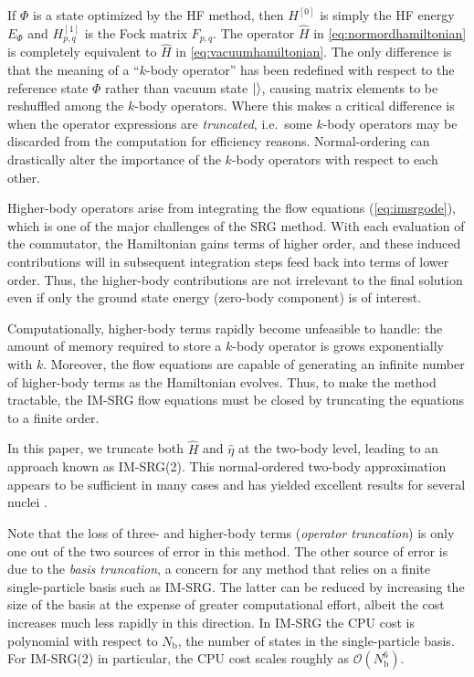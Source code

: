 If $\Phi$ is a state optimized by the HF method, then $H^{[0]}$ is simply the HF energy $E_\Phi$ and $H^{[1]}_{p, q}$ is the Fock matrix $F_{p, q}$.  The operator $\hat H$ in \eqref{eq:normordhamiltonian} is completely equivalent to $\hat H$ in \eqref{eq:vacuumhamiltonian}.  The only difference is that the meaning of a ``$k$-body operator'' has been redefined with respect to the reference state $\Phi$ rather than vacuum state $|  \rangle$, causing matrix elements to be reshuffled among the $k$-body operators.  Where this makes a critical difference is when the operator expressions are \emph{truncated}, i.e.\ some $k$-body operators may be discarded from the computation for efficiency reasons.  Normal-ordering can drastically alter the importance of the $k$-body operators with respect to each other.

Higher-body operators arise from integrating the flow equations (\ref{eq:imsrgode}), which is one of the major challenges of the SRG method.  With each evaluation of the commutator, the Hamiltonian gains terms of higher order, and these induced contributions will in subsequent integration steps feed back into terms of lower order.  Thus, the higher-body contributions are not irrelevant to the final solution even if only the ground state energy (zero-body component) is of interest.

Computationally, higher-body terms rapidly become unfeasible to handle: the amount of memory required to store a $k$-body operator is grows exponentially with $k$.  Moreover, the flow equations are capable of generating an infinite number of higher-body terms as the Hamiltonian evolves.  Thus, to make the method tractable, the IM-SRG flow equations must be closed by truncating the equations to a finite order.

In this paper, we truncate both $\hat{H}$ and $\hat{\eta}$ at the two-body level, leading to an approach known as IM-SRG(2).  This normal-ordered two-body approximation appears to be sufficient in many cases and has yielded excellent results for several nuclei \cite{PhysRevLett.106.222502,PhysRevLett.109.052501,IMSRG}.

Note that the loss of three- and higher-body terms (\textit{operator truncation}) is only one out of the two sources of error in this method.  The other source of error is due to the \textit{basis truncation}, a concern for any method that relies on a finite single-particle basis such as IM-SRG.  The latter can be reduced by increasing the size of the basis at the expense of greater computational effort, albeit the cost increases much less rapidly in this direction.  In IM-SRG the CPU cost is polynomial with respect to $N_{\mathrm{b}}$, the number of states in the single-particle basis.  For IM-SRG(2) in particular, the CPU cost scales roughly as $\mathcal{O}(N_{\mathrm{b}}^6)$.

